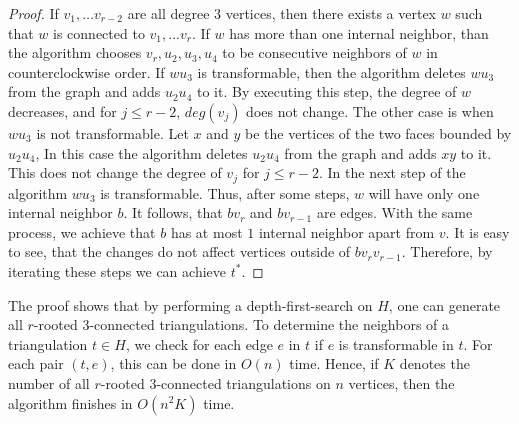 \begin{proof}
  If $v_1, \dots v_{r - 2}$ are all degree $3$ vertices, then there exists a vertex $w$
  such that $w$ is connected to $v_1, \dots v_r$. If $w$ has
  more than one internal neighbor, than the algorithm chooses $v_r, u_2, u_3, u_4$ to
  be consecutive neighbors of $w$ in counterclockwise order. If $wu_3$ is transformable,
  then the algorithm deletes $wu_3$ from the graph and adds $u_2u_4$ to it. By executing this step,
  the degree of $w$ decreases, and for $j \le r - 2$, $deg(v_j)$ does not change.
  The other case is when $wu_3$ is not transformable. Let $x$ and $y$ be the
  vertices of the two faces bounded by $u_2u_4$, In this case the algorithm
  deletes $u_2u_4$ from the graph and adds $xy$ to it. This does not change the
  degree of $v_j$ for $j \le r - 2$. In the next step of the algorithm $wu_3$ is
  transformable. Thus, after some steps, $w$ will have only one internal neighbor $b$.
  It follows, that $bv_r$ and $bv_{r - 1}$ are edges. With the same process, we
  achieve that $b$ has at most $1$ internal neighbor apart from $v$. It is easy to see, that
  the changes do not affect vertices outside of $bv_rv_{r - 1}$. Therefore, by iterating these
  steps we can achieve $t^*$.
\end{proof}

The proof shows that by performing a depth-first-search on $H$, one
can generate all $r$-rooted $3$-connected triangulations. To determine the neighbors
of a triangulation $t \in H$, we check for each edge $e$ in $t$ if $e$ is transformable in $t$.
For each pair $(t, e)$, this can be done in $O(n)$ time. Hence, if
$K$ denotes the number of all $r$-rooted $3$-connected triangulations on $n$ vertices, then
the algorithm finishes in $O(n^2K)$ time.
